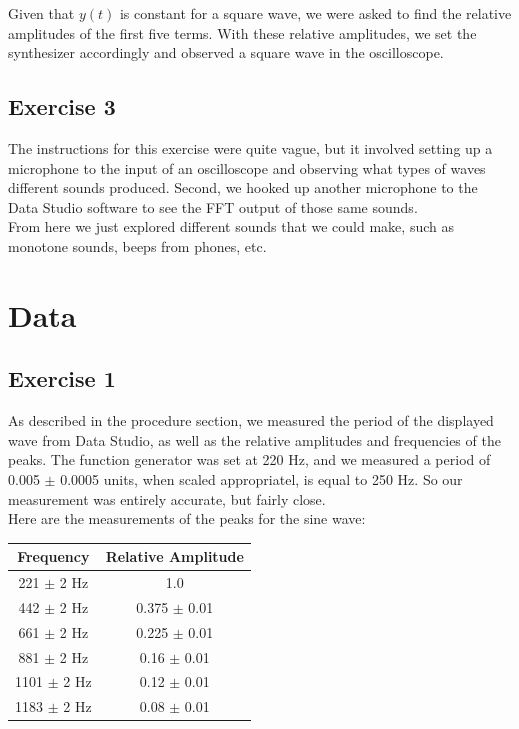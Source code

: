 \documentclass[a4paper,12pt]{article}
\begin{document}
Given that $y(t)$ is constant for a square wave, we were asked to find
the relative amplitudes of the first five terms. With these relative
amplitudes, we set the synthesizer accordingly and observed a square
wave in the oscilloscope.

\subsection{Exercise 3}
The instructions for this exercise were quite vague, but it involved
setting up a microphone to the input of an oscilloscope and observing
what types of waves different sounds produced. Second, we hooked up
another microphone to the Data Studio software to see the FFT output
of those same sounds. \\

From here we just explored different sounds that we could make, such
as monotone sounds, beeps from phones, etc.

\section{Data}
\subsection{Exercise 1}
As described in the procedure section, we measured the period of the
displayed wave from Data Studio, as well as the relative amplitudes
and frequencies of the peaks. The function generator was set at 220
Hz, and we measured a period of 0.005 $\pm$ 0.0005 units, when scaled
appropriatel, is equal to 250 Hz. So our measurement was entirely
accurate, but fairly close. \\

Here are the measurements of the peaks for the sine wave: \\

\begin{tabular}{c | c}
  Frequency & Relative Amplitude \\
  \hline
  221 $\pm$ 2 Hz & 1.0 \\
  442 $\pm$ 2 Hz & 0.375 $\pm$ 0.01 \\
  661 $\pm$ 2 Hz & 0.225 $\pm$ 0.01 \\
  881 $\pm$ 2 Hz & 0.16 $\pm$ 0.01 \\
  1101 $\pm$ 2 Hz & 0.12 $\pm$ 0.01 \\
  1183 $\pm$ 2 Hz & 0.08 $\pm$ 0.01 \\
\end{tabular} \\
\end{document}
